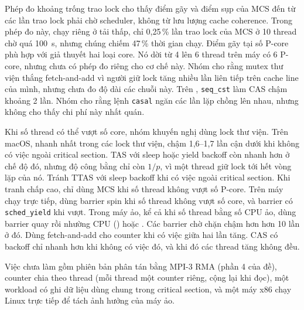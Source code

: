 Phép đo khoảng trống trao lock cho thấy điểm gãy và điểm sụp của MCS đến từ các lần trao lock phải chờ
scheduler, không từ lưu lượng cache coherence. Trong phép đo này, chạy riêng ở tải thấp, chỉ 0,25\,\% lần trao lock của MCS ở 10 thread chờ quá 100~\textmu s, nhưng chúng chiếm
47\,\% thời gian chạy. Điểm gãy tại số P-core phù hợp với giả thuyết hai loại core. Nó dời từ 4 lên 6
thread trên máy có 6 P-core, nhưng chưa có phép đo riêng cho cơ chế này. Nhóm cho rằng mutex thư viện
thắng fetch-and-add vì người giữ lock tăng nhiều lần liên tiếp trên cache line của mình, nhưng chưa đo
độ dài các chuỗi này. Trên , \texttt{seq\_cst} làm CAS chậm khoảng 2 lần. Nhóm cho
rằng lệnh \texttt{casal} ngăn các lần lặp chồng lên nhau, nhưng  không cho thấy chi
phí này nhất quán.

Khi số thread có thể vượt số core, nhóm khuyến nghị dùng lock thư viện. Trên macOS,
 nhanh nhất trong các lock thư viện, chậm 1,6--1,7 lần cận dưới khi không có
việc ngoài critical section. TAS với sleep hoặc yield backoff còn nhanh hơn ở chế độ đó, nhưng độ công
bằng chỉ còn $1/p$, vì một thread giữ lock tới hết vòng lặp của nó. Tránh TTAS với sleep backoff khi có
việc ngoài critical section. Khi tranh chấp cao, chỉ dùng MCS khi số thread không vượt số P-core. Trên máy chạy trực tiếp,
dùng barrier spin khi số thread không vượt số core, và barrier có \texttt{sched\_yield} khi vượt. Trong
máy ảo, kể cả khi số thread bằng số CPU ảo, dùng barrier quay rồi nhường CPU ()
hoặc . Các barrier chờ chặn chậm hơn  hơn 10 lần ở đó. Dùng
fetch-and-add cho counter khi có việc giữa hai lần tăng. CAS có backoff chỉ nhanh hơn khi không có việc
đó, và khi đó các thread tăng không đều.

Việc chưa làm gồm phiên bản phân tán bằng MPI-3 RMA (phần 4 của đề), counter chia theo thread (mỗi
thread một counter riêng, cộng lại khi đọc), một workload có ghi dữ liệu dùng chung trong critical
section, và một máy x86 chạy Linux trực tiếp để tách ảnh hưởng của máy ảo.

